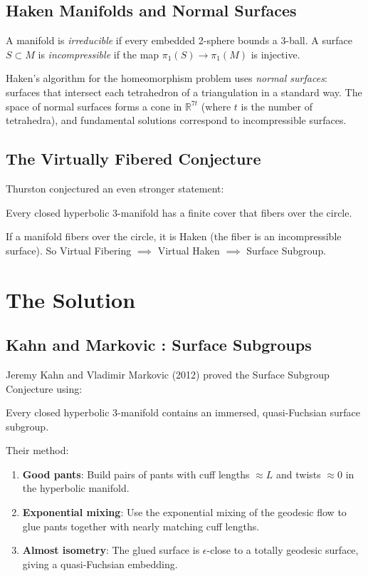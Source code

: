 \subsection{Haken Manifolds and Normal Surfaces}
A manifold is \emph{irreducible} if every embedded 2-sphere bounds a 3-ball. A surface $S \subset M$ is \emph{incompressible} if the map $\pi_1(S) \to \pi_1(M)$ is injective.

Haken's algorithm for the homeomorphism problem uses \emph{normal surfaces}: surfaces that intersect each tetrahedron of a triangulation in a standard way. The space of normal surfaces forms a cone in $\mathbb{R}^{7t}$ (where $t$ is the number of tetrahedra), and fundamental solutions correspond to incompressible surfaces.

\subsection{The Virtually Fibered Conjecture}
Thurston conjectured an even stronger statement:

\begin{conjecture}
Every closed hyperbolic 3-manifold has a finite cover that fibers over the circle.
\end{conjecture}

If a manifold fibers over the circle, it is Haken (the fiber is an incompressible surface). So Virtual Fibering $\implies$ Virtual Haken $\implies$ Surface Subgroup.

\section{The Solution}

\subsection{Kahn and Markovic \cite{kahnmarkovic2012}: Surface Subgroups}
Jeremy Kahn and Vladimir Markovic (2012) proved the Surface Subgroup Conjecture using:

\begin{theorem}
Every closed hyperbolic 3-manifold contains an immersed, quasi-Fuchsian surface subgroup.
\end{theorem}

Their method:
\begin{enumerate}
\item \textbf{Good pants}: Build pairs of pants with cuff lengths $\approx L$ and twists $\approx 0$ in the hyperbolic manifold.
\item \textbf{Exponential mixing}: Use the exponential mixing of the geodesic flow to glue pants together with nearly matching cuff lengths.
\item \textbf{Almost isometry}: The glued surface is $\epsilon$-close to a totally geodesic surface, giving a quasi-Fuchsian embedding.
\end{enumerate}

